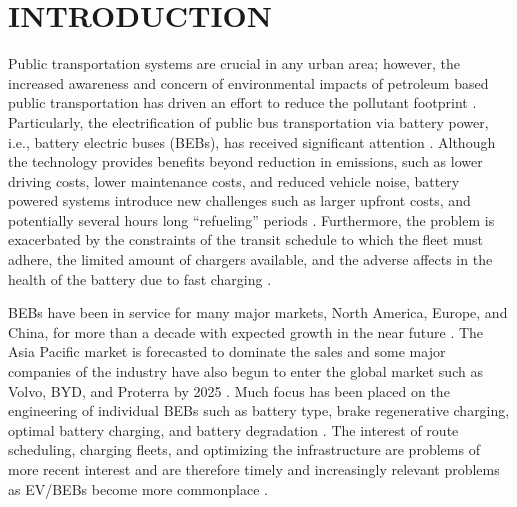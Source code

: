 \documentclass[ee,thesis]{usuthesis}
\begin{document}
\chapter{INTRODUCTION}
\label{sec:introduction}
Public transportation systems are crucial in any urban area; however, the increased awareness and concern of
environmental impacts of petroleum based public transportation has driven an effort to reduce the pollutant footprint
\cite{de-2014-simul-elect,xylia-2018-role-charg,guida-2017-zeeus-repor-europ,li-2016-batter-elect}. Particularly,
the electrification of public bus transportation via battery power, i.e., battery electric buses (BEBs), has received
significant attention \cite{li-2016-batter-elect}. Although the technology provides benefits beyond reduction in
emissions, such as lower driving costs, lower maintenance costs, and reduced vehicle noise, battery powered systems
introduce new challenges such as larger upfront costs, and potentially several hours long ``refueling'' periods
\cite{xylia-2018-role-charg,li-2016-batter-elect}. Furthermore, the problem is exacerbated by the constraints of the
transit schedule to which the fleet must adhere, the limited amount of chargers available, and the adverse affects in
the health of the battery due to fast charging \cite{lutsey-2019-updat-elect}.

BEBs have been in service for many major markets, North America, Europe, and China, for more than a decade with expected
growth in the near future \cite{deng-2021-survey-elect}. The Asia Pacific market is forecasted to dominate the sales
and some major companies of the industry have also begun to enter the global market such as Volvo, BYD, and Proterra by
2025 \cite{deng-2021-survey-elect}. Much focus has been placed on the engineering of individual BEBs such as battery
type, brake regenerative charging, optimal battery charging, and battery degradation \cite{chen-2008-desig-grey,abdollahi-2016-optim-batter,kuhne-2010-elect,deng-2021-survey-elect}. The interest of route scheduling, charging
fleets, and optimizing the infrastructure are problems of more recent interest and are therefore timely and increasingly
relevant problems as EV/BEBs become more commonplace \cite{hoke-2014-accoun-lithium,sebastiani-2016-evaluat-elect,wei-2018-optim-spatio}.
\end{document}

